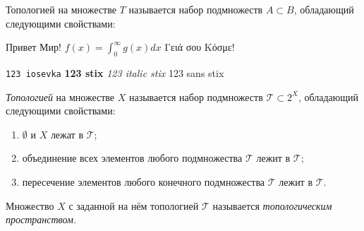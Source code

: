 \documentclass{article}
\begin{document}
Топологией на множестве $ T$ называется набор подмножеств $ A \subset B$,
обладающий следующими свойствами:

Привет Мир! 
$ f(x) = \int_{0}^{\infty} g(x) dx$ 
Γειά σου Κόσμε!

\texttt{123 iosevka}
\textbf{123 stix}
\textit{123 italic stix}
\textsf{123 sans stix}

	\textit{Топологией} на множестве $ X $ называется набор подмножеств $ \mathcal{T} \subset 2^X $, обладающий следующими свойствами: 
	\begin{enumerate}
		\item $ \emptyset $ и $ X $ лежат в $ \mathcal{T} $; 
		\item объединение всех элементов любого подмножества $ \mathcal{T} $ лежит в $ \mathcal{T} $; 
		\item пересечение элементов любого конечного подмножества $ \mathcal{T} $ лежит в $ \mathcal{T} $. 
	\end{enumerate}
	Множество $ X $ с заданной на нём топологией $ \mathcal{T} $ называется \textit{топологическим пространством.}
\end{document}
